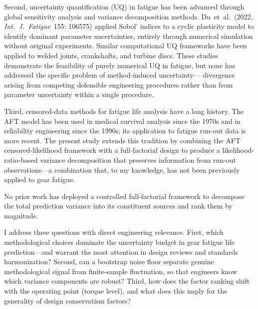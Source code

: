 \documentclass[12pt,a4paper]{article}
\begin{document}
Second, uncertainty quantification (UQ) in fatigue has been advanced
through global sensitivity analysis and variance decomposition methods.
Du~et~al.~(2022, \emph{Int.~J.~Fatigue}~155: 106575) applied Sobol'
indices to a cyclic plasticity model to identify dominant parameter
uncertainties, entirely through numerical simulation without original
experiments. Similar computational UQ frameworks have been applied to
welded joints, crankshafts, and turbine discs. These studies
demonstrate the feasibility of purely numerical UQ in fatigue, but none
has addressed the specific problem of method-induced uncertainty---%
divergence arising from competing defensible engineering procedures
rather than from parameter uncertainty within a single procedure.

Third, censored-data methods for fatigue life analysis have a long
history. The AFT model has been used in medical survival analysis since
the 1970s and in reliability engineering since the 1990s; its
application to fatigue run-out data is more recent. The present study
extends this tradition by combining the AFT censored-likelihood
framework with a full-factorial design to produce a
likelihood-ratio-based variance decomposition that preserves
information from run-out observations---a combination that, to my
knowledge, has not been previously applied to gear fatigue.

No prior work has deployed a controlled full-factorial framework to
decompose
the total prediction variance into its constituent sources and rank
them by magnitude.

I address three questions with direct engineering relevance. First,
which methodological choices dominate the uncertainty budget in gear
fatigue life prediction---and warrant the most attention in
design reviews and standards harmonization? Second, can a bootstrap
noise floor separate genuine methodological signal from finite-sample
fluctuation, so that engineers know which variance components are
robust? Third, how does the factor ranking shift with the operating
point (torque level), and what does this imply for the generality of
design conservatism factors?
\end{document}
